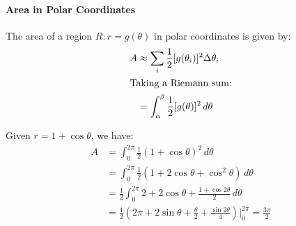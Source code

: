 \documentclass[11pt]{article}
\begin{document}
\paragraph{Area in Polar Coordinates} The area of a region $R: r = g(\theta)$ in polar coordinates is given by:
\begin{align}
    A &\approx \sum_{i} \frac{1}{2} [g(\theta_i)]^2 \Delta \theta_i \nonumber \\
    \intertext{Taking a Riemann sum:}
    &= \int_{\alpha}^{\beta} \frac{1}{2} [g(\theta)]^2 \, d\theta
\end{align}
\begin{example}
    Given $r = 1 + \cos \theta$, we have:
    \begin{align*}
        A &= \int_0^{2\pi} \frac{1}{2} (1 + \cos \theta)^2 \, d\theta \\
        &= \int_0^{2\pi} \frac{1}{2} (1 + 2\cos \theta + \cos^2 \theta) \, d\theta \\
        &= \frac{1}{2}\int_0^{2\pi} 2 + 2\cos \theta + \frac{1 + \cos 2\theta}{2} \, d\theta \\
        &= \frac{1}{2}\left(2\pi + 2\sin \theta + \frac{\theta}{2} + \frac{\sin 2\theta}{4}\right) \Big|_0^{2\pi}= \frac{3\pi}{2}
    \end{align*}
\end{example}
\end{document}
